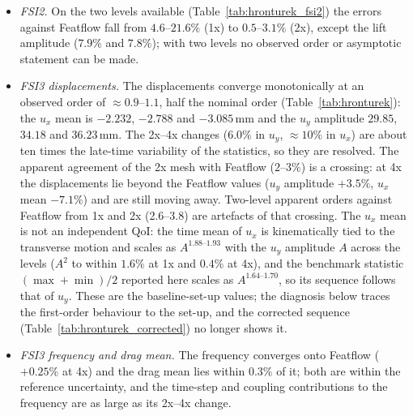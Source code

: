 \begin{itemize}
	On the same nodes the SU2 fluid has the larger error against Featflow in every QoI at every level, which is consistent with its first-order wall shear, and $u_x$, the plate stretching under a load with a large viscous part, is the QoI it affects most.
	This is the only fully independent solution of FSI1 besides Featflow; its differences from Table~\ref{tab:fsi1} in $u_y$ and lift, which are dominated by the pressure load, lie within its own GCIs ($0.81\%$ and $0.22\%$ on 4x), and its $u_x$ and drag are not resolved closely enough to discriminate between the two other solutions.
	\item \emph{FSI2.} On the two levels available (Table~\ref{tab:hronturek_fsi2}) the errors against Featflow fall from $4.6$--$21.6\%$ (1x) to $0.5$--$3.1\%$ (2x), except the lift amplitude ($7.9\%$ and $7.8\%$); with two levels no observed order or asymptotic statement can be made.
	\item \emph{FSI3 displacements.} The displacements converge monotonically at an observed order of $\approx0.9$--$1.1$, half the nominal order (Table~\ref{tab:hronturek}): the $u_x$ mean is $-2.232$, $-2.788$ and $-3.085\,\mathrm{mm}$ and the $u_y$ amplitude $29.85$, $34.18$ and $36.23\,\mathrm{mm}$. The 2x--4x changes ($6.0\%$ in $u_y$, $\approx10\%$ in $u_x$) are about ten times the late-time variability of the statistics, so they are resolved. The apparent agreement of the 2x mesh with Featflow ($2$--$3\%$) is a crossing: at 4x the displacements lie beyond the Featflow values ($u_y$ amplitude $+3.5\%$, $u_x$ mean $-7.1\%$) and are still moving away. Two-level apparent orders against Featflow from 1x and 2x (2.6--3.8) are artefacts of that crossing. The $u_x$ mean is not an independent QoI: the time mean of $u_x$ is kinematically tied to the transverse motion and scales as $A^{1.88\text{--}1.93}$ with the $u_y$ amplitude $A$ across the levels ($A^2$ to within $1.6\%$ at 1x and $0.4\%$ at 4x), and the benchmark statistic $(\max+\min)/2$ reported here scales as $A^{1.64\text{--}1.70}$, so its sequence follows that of $u_y$. These are the baseline-set-up values; the diagnosis below traces the first-order behaviour to the set-up, and the corrected sequence (Table~\ref{tab:hronturek_corrected}) no longer shows it.
	\item \emph{FSI3 frequency and drag mean.} The frequency converges onto Featflow ($+0.25\%$ at 4x) and the drag mean lies within $0.3\%$ of it; both are within the reference uncertainty, and the time-step and coupling contributions to the frequency are as large as its 2x--4x change.

\end{itemize}
